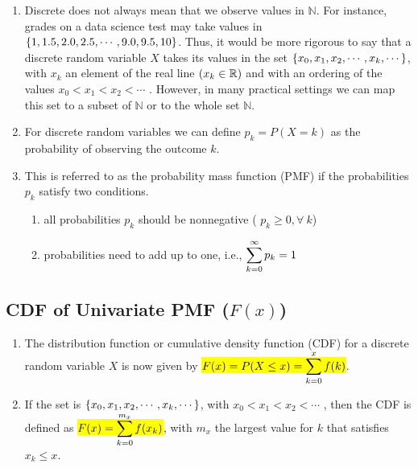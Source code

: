 \begin{enumerate}
    \item Discrete does not always mean that we observe values in $\mathbb{N}$.
    For instance, grades on a data science test may take values in $\left\{1, 1.5, 2.0, 2.5, \cdots , 9.0, 9.5, 10\right\}$.
    Thus, it would be more rigorous to say that a discrete random variable $X$ takes its values in the set $\left\{x_0, x_1, x_2, \cdots , x _k , \cdots\right\}$, with $x _k$ an element of the real line $(x _k \in \mathbb{R})$ and with an ordering of the values $x_0 < x_1 < x_2 < \cdots$ .
    However, in many practical settings we can map this set to a subset of $\mathbb{N}$ or to the whole set $\mathbb{N}$.
    \hfill \cite{statistics/book/Statistics-for-Data-Scientists/Maurits-Kaptein}

    \item For discrete random variables we can define $p _k = P(X = k)$ as the probability of observing the outcome $k$.
    \hfill \cite{statistics/book/Statistics-for-Data-Scientists/Maurits-Kaptein}

    \item This is referred to as the probability mass function (PMF) if the probabilities $p _k$ satisfy two conditions.
    \hfill \cite{statistics/book/Statistics-for-Data-Scientists/Maurits-Kaptein}
    \begin{enumerate}
        \item all probabilities $p _k$ should be nonnegative ( $p _k \geq 0, \forall\ k$)
        \hfill \cite{statistics/book/Statistics-for-Data-Scientists/Maurits-Kaptein}

        \item probabilities need to add up to one, i.e., $\displaystyle\sum^{\infty}_{k=0} p _k = 1$
        \hfill \cite{statistics/book/Statistics-for-Data-Scientists/Maurits-Kaptein}
    \end{enumerate}
\end{enumerate}


\subsection{CDF of Univariate PMF ($F(x)$)}

\begin{enumerate}
    \item The distribution function or cumulative density function (CDF) for a discrete random variable $X$ is now given by \colorbox{yellow}{$F(x) = P(X \leq x) = \displaystyle\sum^{x}_ {k=0} f (k)$}.
    \hfill \cite{statistics/book/Statistics-for-Data-Scientists/Maurits-Kaptein}

    \item If the set is $\left\{x_0, x_1, x_2, \cdots , x _k , \cdots\right\}$, with $x_0 < x_1 < x_2 < \cdots$ , then the CDF is defined as \colorbox{yellow}{$F(x) =\displaystyle\sum^{m_x} _{k=0} f (x _k )$}, with $m _x$ the largest value for $k$ that satisfies $x_ k \leq x$.
    \hfill \cite{statistics/book/Statistics-for-Data-Scientists/Maurits-Kaptein}
\end{enumerate}




